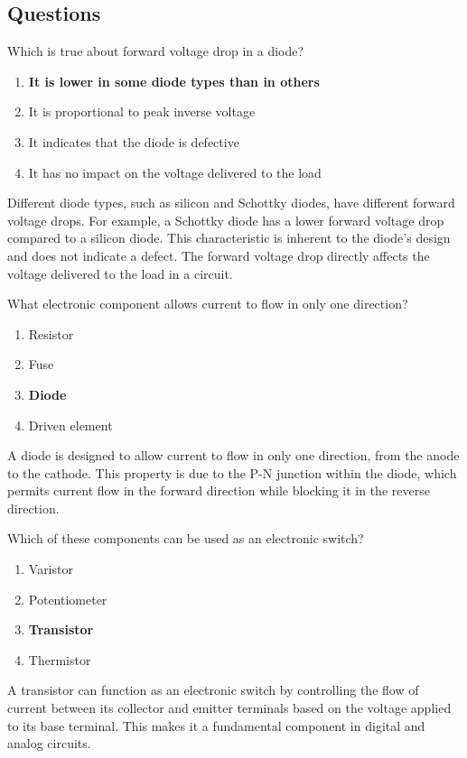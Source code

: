\subsection*{Questions}
\begin{tcolorbox}[colback=gray!10!white,colframe=black!75!black,title={T6B01}]
    Which is true about forward voltage drop in a diode?
    \begin{enumerate}[label=\Alph*),noitemsep]
        \item \textbf{It is lower in some diode types than in others}
        \item It is proportional to peak inverse voltage
        \item It indicates that the diode is defective
        \item It has no impact on the voltage delivered to the load
    \end{enumerate}
\end{tcolorbox}
Different diode types, such as silicon and Schottky diodes, have different forward voltage drops. For example, a Schottky diode has a lower forward voltage drop compared to a silicon diode. This characteristic is inherent to the diode's design and does not indicate a defect. The forward voltage drop directly affects the voltage delivered to the load in a circuit. %

\begin{tcolorbox}[colback=gray!10!white,colframe=black!75!black,title={T6B02}]
    What electronic component allows current to flow in only one direction?
    \begin{enumerate}[label=\Alph*),noitemsep]
        \item Resistor
        \item Fuse
        \item \textbf{Diode}
        \item Driven element
    \end{enumerate}
\end{tcolorbox}
A diode is designed to allow current to flow in only one direction, from the anode to the cathode. This property is due to the P-N junction within the diode, which permits current flow in the forward direction while blocking it in the reverse direction. %

\begin{tcolorbox}[colback=gray!10!white,colframe=black!75!black,title={T6B03}]
    Which of these components can be used as an electronic switch?
    \begin{enumerate}[label=\Alph*),noitemsep]
        \item Varistor
        \item Potentiometer
        \item \textbf{Transistor}
        \item Thermistor
    \end{enumerate}
\end{tcolorbox}
A transistor can function as an electronic switch by controlling the flow of current between its collector and emitter terminals based on the voltage applied to its base terminal. This makes it a fundamental component in digital and analog circuits. %


